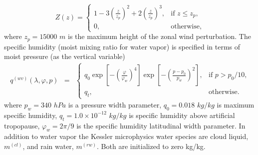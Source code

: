 \documentclass{agujournal}
\begin{document}
{\begin{equation}
Z(z) = \left\{ \begin{array}{ll} \displaystyle 1 - 3 \left( \frac{z}{z_p} \right)^2 + 2 \left( \frac{z}{z_p} \right)^3, & \mbox{if $z \leq z_p$,} \\ 0, & \mbox{otherwise,} \end{array} \right.
\end{equation}
where $z_p=15000$ $m$ is the maximum height of the zonal wind perturbation. The specific humidity (moist mixing ratio for water vapor) is specified in terms of moist pressure (as the vertical variable)
\begin{eqnarray}
q^{(wv)}(\lambda, \varphi, p) &=& \left\{ \begin{array}{ll} q_0 \exp\left[- \left(\frac{\varphi}{\varphi_{w}}\right)^4 \right] \exp\left[- \left(\frac{p-p_0}{p_{w}}\right)^2  \right], & \mbox{if $p > p_0 / 10$,} \\ q_{t}, & \mbox{otherwise.} \end{array} \right.
\end{eqnarray} 
where $p_w=340$ $hPa$ is a pressure width parameter, $q_0=0.018$ $kg/kg$ is maximum specific humidity, $q_t=1.0\times 10^{-12}$ $kg/kg$ is specific humidity above artificial tropopause, $\varphi_{w}=2\pi/9$ is the specific humidity latitudinal width parameter. In addition to water vapor the Kessler microphysics water species are cloud liquid, $m^{(cl)}$, and rain water, $m^{(rw)}$. Both are initialized to zero kg/kg.


%
%

%

}
\end{document}
